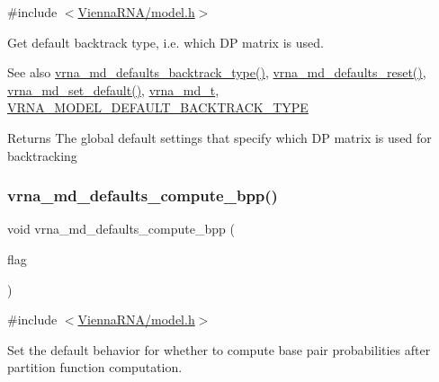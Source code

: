 {\ttfamily \#include $<$\mbox{\hyperlink{model_8h}{Vienna\+R\+N\+A/model.\+h}}$>$}



Get default backtrack type, i.\+e. which DP matrix is used. 

\begin{DoxySeeAlso}{See also}
\mbox{\hyperlink{group__model__details_ga68305274de96b56b7799575e222560d8}{vrna\+\_\+md\+\_\+defaults\+\_\+backtrack\+\_\+type()}}, \mbox{\hyperlink{group__model__details_ga70834424cf804d149937de89f80ceb45}{vrna\+\_\+md\+\_\+defaults\+\_\+reset()}}, \mbox{\hyperlink{group__model__details_ga8ac6ff84936282436f822644bf841f66}{vrna\+\_\+md\+\_\+set\+\_\+default()}}, \mbox{\hyperlink{group__model__details_ga1f8a10e12a0a1915f2a4eff0b28ea17c}{vrna\+\_\+md\+\_\+t}}, \mbox{\hyperlink{group__model__details_gad0e81fcaca53c4a826c68e0796de2afb}{V\+R\+N\+A\+\_\+\+M\+O\+D\+E\+L\+\_\+\+D\+E\+F\+A\+U\+L\+T\+\_\+\+B\+A\+C\+K\+T\+R\+A\+C\+K\+\_\+\+T\+Y\+PE}} 
\end{DoxySeeAlso}
\begin{DoxyReturn}{Returns}
The global default settings that specify which DP matrix is used for backtracking 
\end{DoxyReturn}
\mbox{\label{group__model__details_gaf1b5db10f1f476767f9a95f8a78e3132}} 
\subsubsection{\texorpdfstring{vrna\+\_\+md\+\_\+defaults\+\_\+compute\+\_\+bpp()}{vrna\_md\_defaults\_compute\_bpp()}}
{\footnotesize\ttfamily void vrna\+\_\+md\+\_\+defaults\+\_\+compute\+\_\+bpp (\begin{DoxyParamCaption}\item[{int}]{flag }\end{DoxyParamCaption})}



{\ttfamily \#include $<$\mbox{\hyperlink{model_8h}{Vienna\+R\+N\+A/model.\+h}}$>$}



Set the default behavior for whether to compute base pair probabilities after partition function computation. 

